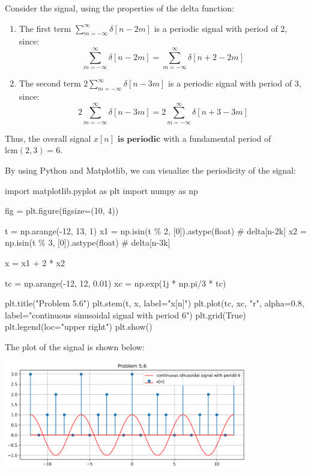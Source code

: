 \documentclass[a4paper, 10pt]{article}
\begin{document}
\begin{solution}
Consider the signal, using the properties of the delta function:

\begin{enumerate}
    \item The first term \( \sum_{m=-\infty}^{\infty} \delta[n-2m] \) is a periodic signal with period of 2, since:
    \[
        \sum_{m=-\infty}^{\infty} \delta[n-2m] = \sum_{m=-\infty}^{\infty} \delta[n+2-2m]
    \]
    \item The second term \( 2\sum_{m=-\infty}^{\infty} \delta[n-3m] \) is a periodic signal with period of 3, since:
    \[
        2\sum_{m=-\infty}^{\infty} \delta[n-3m] = 2\sum_{m=-\infty}^{\infty} \delta[n+3-3m]
    \]
\end{enumerate}
Thus, the overall signal \( x[n] \) \( \boxed{\textbf{is periodic}} \) with a fundamental period of \( \text{lcm}(2, 3) = \boxed{6} \).

\vspace{5mm}

By using Python and Matplotlib, we can visualize the periodicity of the signal:
\begin{codingbox}
import matplotlib.pyplot as plt
import numpy as np

fig = plt.figure(figsize=(10, 4))

t = np.arange(-12, 13, 1)
x1 = np.isin(t \% 2, [0]).astype(float) # delta[n-2k]
x2 = np.isin(t \% 3, [0]).astype(float) # delta[n-3k]

x = x1 + 2 * x2

tc = np.arange(-12, 12, 0.01)
xc = np.exp(1j * np.pi/3 * tc)

plt.title("Problem 5.6")
plt.stem(t, x, label="x[n]")
plt.plot(tc, xc, "r", alpha=0.8, label="continuous sinusoidal signal with period 6")
plt.grid(True)
plt.legend(loc="upper right")
plt.show()
\end{codingbox}

The plot of the signal is shown below:
\begin{center}
    \includegraphics[width=0.8\textwidth]{images/problem_5_6.png}
\end{center}
\end{solution}
\end{document}
